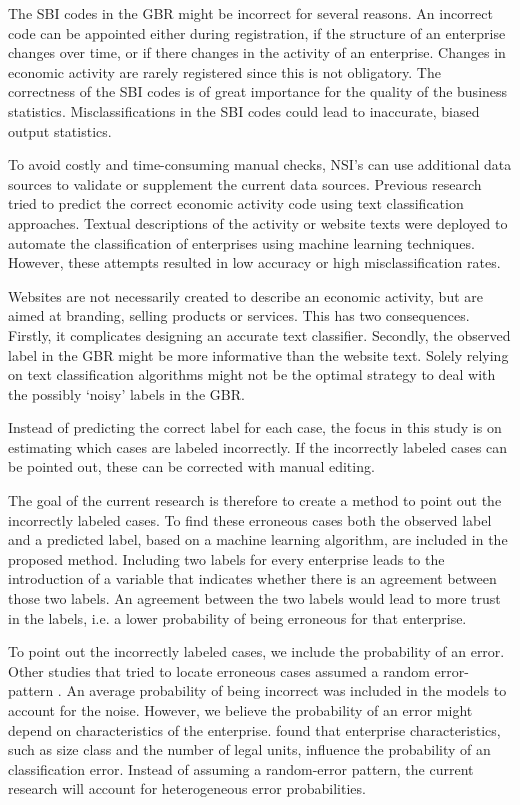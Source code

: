 \documentclass[12pt, a4paper, titlepage]{article}
\begin{document}
The SBI codes in the GBR might be incorrect for several reasons. An incorrect code can be appointed either during registration, if the structure of an enterprise changes over time, or if there changes in the activity of an enterprise. Changes in economic activity are rarely registered \citep{Christensen2008, DeldenScholtusBurger} since this is not obligatory. The correctness of the SBI codes is of great importance for the quality of the business statistics. Misclassifications in the SBI codes could lead to inaccurate, biased output statistics.

To avoid costly and time-consuming manual checks, NSI’s can use additional data sources to validate or supplement the current data sources. Previous research tried to predict the correct economic activity code using text classification approaches. Textual descriptions of the activity \citep{Caterini} or website texts \citep{Roelands, Berardi, Heidi} were deployed to automate the classification of enterprises using machine learning techniques. However, these attempts resulted in low accuracy or high misclassification rates. 

Websites are not necessarily created to describe an economic activity, but are aimed at branding, selling products or services. This has two consequences. Firstly, it complicates designing an accurate text classifier. Secondly, the observed label in the GBR might be more informative than the website text. Solely relying on text classification algorithms might not be the optimal strategy to deal with the possibly ‘noisy’ labels in the GBR.

Instead of predicting the correct label for each case, the focus in this study is on estimating which cases are labeled incorrectly. If the incorrectly labeled cases can be pointed out, these can be corrected with manual editing. 

The goal of the current research is therefore to create a method to point out the incorrectly labeled cases. To find these erroneous cases both the observed label and a predicted label, based on a machine learning algorithm, are included in the proposed method. Including two labels for every enterprise leads to the introduction of a variable that indicates whether there is an agreement between those two labels. An agreement between the two labels would lead to more trust in the labels, i.e. a lower probability of being erroneous for that enterprise.

To point out the incorrectly labeled cases, we include the probability of an error. Other studies that tried to locate erroneous cases assumed a random error-pattern \citep{Sigurdsson,Eskin,DiZio}. An average probability of being incorrect was included in the models to account for the noise. However, we believe the probability of an error might depend on characteristics of the enterprise. \citet{DeldenScholtusBurger} found that enterprise characteristics, such as size class and the number of legal units, influence the probability of an classification error. Instead of assuming a random-error pattern, the current research will account for heterogeneous error probabilities.
\end{document}
